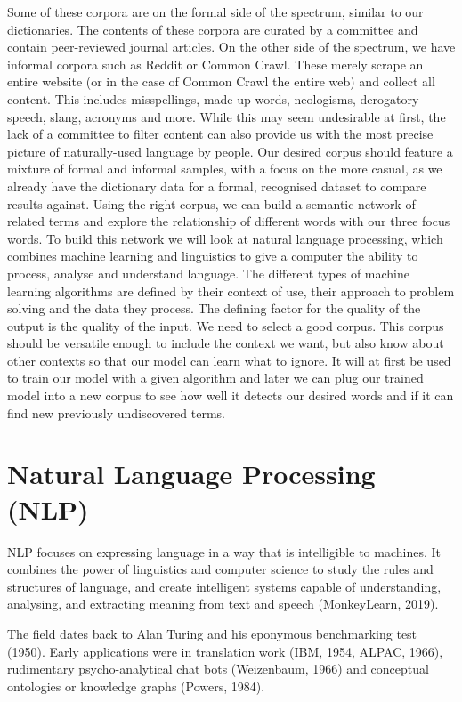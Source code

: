 \documentclass[12pt, usenames, dvipsnames]{report}
\begin{document}
\begin{flushleft}
Some of these corpora are on the formal side of the spectrum, similar to our dictionaries.
The contents of these corpora are curated by a committee and contain peer-reviewed journal articles.
On the other side of the spectrum, we have informal corpora such as Reddit or Common Crawl.
These merely scrape an entire website (or in the case of Common Crawl the entire web) and collect all content.
This includes misspellings, made-up words, neologisms, derogatory speech, slang, acronyms and more.
While this may seem undesirable at first, the lack of a committee to filter content can also provide us with the most precise picture of naturally-used language by people.
Our desired corpus should feature a mixture of formal and informal samples, with a focus on the more casual, as we already have the dictionary data for a formal, recognised dataset to compare results against.
Using the right corpus, we can build a semantic network of related terms and explore the relationship of different words with our three focus words.
To build this network we will look at natural language processing, which combines machine learning and linguistics to give a computer the ability to process, analyse and understand language.
The different types of machine learning algorithms are defined by their context of use, their approach to problem solving and the data they process.
The defining factor for the quality of the output is the quality of the input.
We need to select
a good corpus. This corpus should be versatile enough to include the context we want, but also know about other contexts so that our model can learn what to ignore.
It will at first be used to train our model with a given algorithm and later we can plug our trained model into a new corpus to see how well it detects our desired words and if it can find new previously undiscovered terms.


\chapter{Natural Language Processing (NLP)}

NLP focuses on expressing language in a way that is intelligible to machines.
It combines the power of linguistics and computer science to study the rules and structures of language, and create intelligent systems capable of understanding, analysing, and extracting meaning from text and speech (MonkeyLearn, 2019)\cite{monkeylearn2019}.

The field dates back to Alan Turing and his eponymous benchmarking test (1950)\cite{turing1950}.
Early applications were in translation work (IBM, 1954, ALPAC, 1966)\cite{hutchins2004}\cite{committee1966language}, rudimentary psycho-analytical chat bots (Weizenbaum, 1966)\cite{weizenbaum1966} and conceptual ontologies or knowledge graphs (Powers, 1984)\cite{powers1984}.


\end{flushleft}
\end{document}

